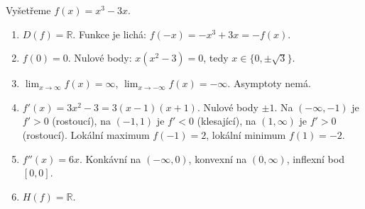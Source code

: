 \begin{example}
  Vyšetřeme $f(x) = x^3 - 3x$.
  \begin{enumerate}
    \item $D(f) = \mathbb{R}$. Funkce je lichá: $f(-x) = -x^3 + 3x = -f(x)$.
    \item $f(0) = 0$. Nulové body: $x(x^2 - 3) = 0$, tedy $x\in\{0, \pm\sqrt{3}\}$.
    \item $\lim_{x\to\infty} f(x) = \infty$, $\lim_{x\to-\infty} f(x) = -\infty$. Asymptoty nemá.
    \item $f'(x) = 3x^2 - 3 = 3(x - 1)(x + 1)$. Nulové body $\pm 1$. Na $(-\infty, -1)$ je $f' > 0$ (rostoucí), na $(-1, 1)$ je $f' < 0$ (klesající), na $(1, \infty)$ je $f' > 0$ (rostoucí). Lokální maximum $f(-1) = 2$, lokální minimum $f(1) = -2$.
    \item $f''(x) = 6x$. Konkávní na $(-\infty, 0)$, konvexní na $(0, \infty)$, inflexní bod $[0, 0]$.
    \item $H(f) = \mathbb{R}$.
  \end{enumerate}
  \begin{center}
  \end{center}


\end{example}
